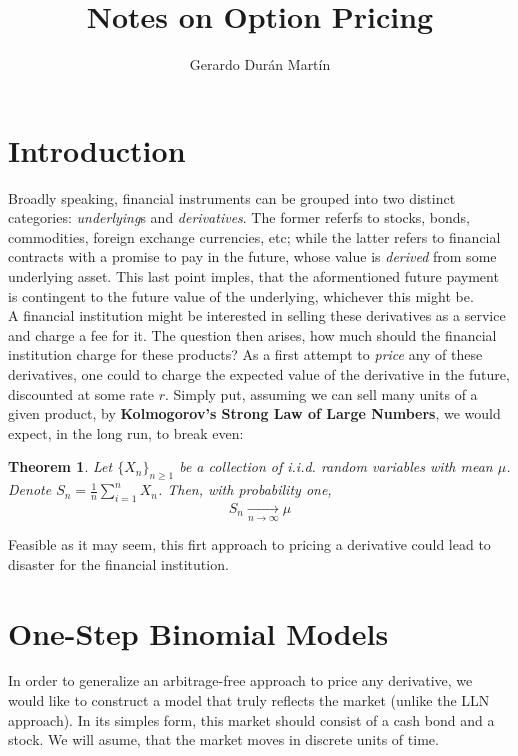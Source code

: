 \documentclass{article}
\title{Notes on Option Pricing}
\author{Gerardo Durán Martín}
\newtheorem{theorem}{Theorem}[section]
\begin{document}
\maketitle


\section{Introduction}
Broadly speaking, financial instruments can be grouped into two distinct categories: \textit{underlying}s and \textit{derivatives}. The former referfs to stocks, bonds, commodities, foreign exchange currencies, etc; while the latter refers to financial contracts with a promise to pay in the future, whose value is \textit{derived} from some underlying asset. This last point imples, that the aformentioned future payment is contingent to the future value of the underlying, whichever this might be.\\

A financial institution might be interested in selling these derivatives as a service and charge a fee for it. The question then arises, how much should the financial institution charge for these products? As a first attempt to \textit{price} any of these derivatives, one could to charge the expected value of the derivative in the future, discounted at some rate $r$. Simply put, assuming we can sell many units of a given product, by \textbf{Kolmogorov's Strong Law of Large Numbers}, we would expect, in the long run, to break even:

\begin{theorem}
    Let $\{X_n\}_{n\geq 1}$ be a collection of i.i.d. random variables with mean $\mu$. Denote $S_n = \frac{1}{n}\sum_{i=1}^n X_n$. Then, with probability one,
    \begin{equation}
        S_n \xrightarrow[n \rightarrow \infty]{}\mu
    \end{equation}
\end{theorem}


Feasible as it may seem, this firt approach to pricing a derivative could lead to disaster for the financial institution.



\section{One-Step Binomial Models}
In order to generalize an arbitrage-free approach to price any derivative, we would like to construct a model that truly reflects the market (unlike the LLN approach). In its simples form, this market should consist of a cash bond and a stock. We will asume, that the market moves in discrete units of time.\\
\end{document}

